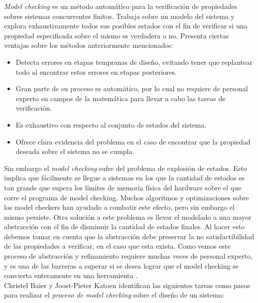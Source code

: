 \documentclass[titlepage, 12pt]{book}
\begin{document}
\textit{Model checking} es un m\'etodo autom\'atico para la verificaci\'on de propiedades sobres sistemas concurrentes finitos. Trabaja sobre un modelo del sistema y explora exhaustivamente todos sus posibles estados con el fin de verificar si una propiedad especificada sobre el mismo es verdadera o no. Presenta ciertas ventajas sobre los m\'etodos anteriormente mencionados:

\begin{itemize}
\item Detecta errores en etapas tempranas de dise\~no, evitando tener que replantear todo al encontrar estos errores en etapas posteriores.

\item Gran parte de su proceso es autom\'atico, por lo cual no requiere de personal experto en campos de la matem\'atica para llevar a cabo las tareas de verificaci\'on.

\item Es exhaustivo con respecto al conjunto de estados del sistema.

\item Ofrece clara evidencia del problema en el caso de encontrar que la propiedad deseada sobre el sistema no se cumpla.
\end{itemize}

Sin embargo el \textit{model checking} sufre del problema de explosi\'on de estados. Esto implica que f\'acilmente se llegue a sistemas en los que la cantidad de estados es tan grande que supera los l\'imites de memoria f\'isica del hardware sobre el que corre el programa de model checking. Muchos algoritmos y optimizaciones sobre los model checkers han ayudado a combatir este efecto, pero sin embargo el mismo persiste. Otra soluci\'on a este problema es llevar el modelado a una mayor abstracci\'on con el fin de disminuir la cantidad de estados finales. Al hacer esto debemos tomar en cuenta que la abstracci\'on debe preservar la no satisfactibilidad de las propiedades a verificar, en el caso que esta exista. Como vemos este proceso de abstracci\'on y refinamiento requiere muchas veces de personal experto, y es una de las barreras a superar si se desea lograr que el model checking se convierta enteramente en una herramienta .\\

Christel Baier y Joost-Pieter Katoen \cite{Baier} identifican las siguientes tareas como pasos para realizar el \textit{proceso de model checking} sobre el dise\~no de un sistema:
\end{document}
